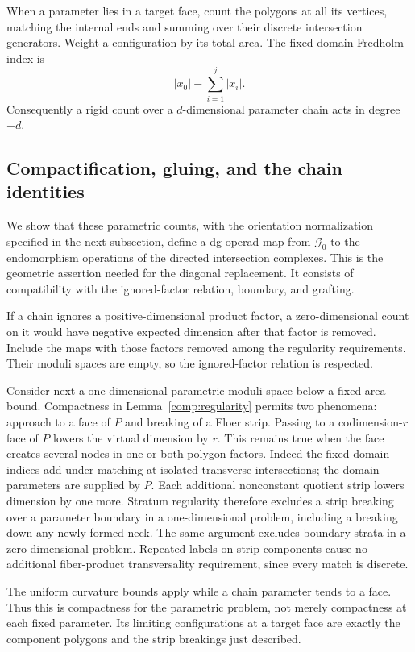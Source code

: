 When a parameter lies in a
target face, count the polygons at all its vertices, matching the
internal ends and summing over their discrete intersection
generators.  Weight a configuration by its total area.  The
fixed-domain Fredholm index is
\[
 |x_0|-\sum_{i=1}^j|x_i|.
\]
Consequently a rigid count over a $d$-dimensional parameter chain
acts in degree $-d$.

\subsection{Compactification, gluing, and the chain identities}
\label{comp:chain-counts}

We show that these parametric counts, with the orientation
normalization specified in the next subsection, define a dg
operad map from $\mathcal G_0$ to the endomorphism operations of the directed
intersection complexes.  This is the geometric assertion needed
for the diagonal replacement.  It consists of compatibility with
the ignored-factor relation, boundary, and grafting.

If a chain ignores a positive-dimensional product factor, a
zero-dimensional count on it would have negative expected
dimension after that factor is removed.  Include the maps with
those factors removed among the regularity requirements.  Their
moduli spaces are empty, so the ignored-factor relation is
respected.

Consider next a one-dimensional parametric moduli space below a
fixed area bound.  Compactness in
Lemma~\ref{comp:regularity} permits two phenomena: approach to a
face of $P$ and breaking of a Floer strip.  Passing to a
codimension-$r$ face of $P$ lowers the virtual dimension by $r$.
This remains true when the face creates several nodes in one or
both polygon factors.  Indeed the fixed-domain indices add under
matching at isolated transverse intersections; the domain
parameters are supplied by $P$.  Each additional nonconstant
quotient strip lowers dimension by one more.  Stratum regularity
therefore excludes a strip breaking over a parameter boundary in
a one-dimensional problem, including a breaking down any newly
formed neck.  The same argument excludes boundary strata in a
zero-dimensional problem.  Repeated labels on strip components
cause no additional fiber-product transversality requirement,
since every match is discrete.

The uniform curvature bounds apply while a chain parameter tends
to a face.  Thus this is compactness for the parametric problem,
not merely compactness at each fixed parameter.  Its limiting
configurations at a target face are exactly the component
polygons and the strip breakings just described.

